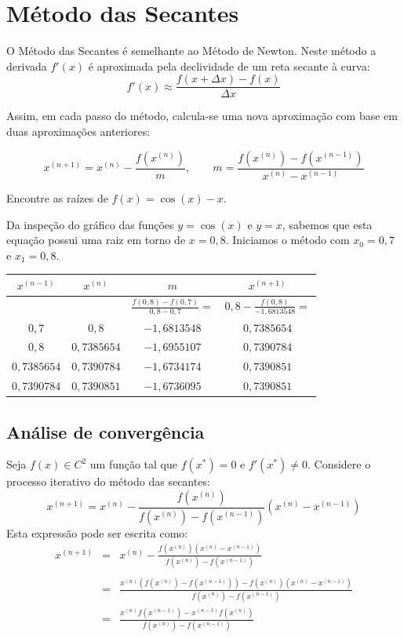 \documentclass[main.tex]{subfiles}
\begin{document}
\section{Método das Secantes}

O Método das Secantes é semelhante ao Método de Newton. Neste método a derivada $f'(x)$ é aproximada pela declividade de um reta secante à curva:
$$f'(x)\approx \frac{f(x+\Delta x)-f(x)}{\Delta x}$$

Assim, em cada passo do método, calcula-se uma nova aproximação com base em duas aproximações anteriores:

$$x^{(n+1)}=x^{(n)} - \frac{f(x^{(n)})}{m}, \qquad m= \frac{f(x^{(n)})-f(x^{(n-1)})}{x^{(n)}-x^{(n-1)}} $$


\begin{ex} Encontre as raízes de $f(x)=\cos(x)-x$.\end{ex}

Da inspeção do gráfico das funções $y=\cos(x)$ e $y=x$, sabemos que esta equação possui uma raiz em torno de $x=0,8$. Iniciamos o método com $x_0=0,7$ e $x_1=0,8$.

\begin{center}
\begin{tabular}{|c|c|c|c|}\hline
$x^{(n-1)}$ & $x^{(n)}$ & $m$ & $x^{(n+1)}$\\\hline
 & & $\frac{f(0,8)-f(0,7)}{0,8-0,7} =$ & $0,8- \frac{f(0,8)}{-1,6813548}=$\\
$0,7$ & $0,8$ & $-1,6813548$ & $0,7385654$\\\hline
$0,8$ & $0,7385654$ & $-1,6955107$ & $0,7390784$ \\\hline
 $0,7385654$ & $0,7390784$ &  $-1,6734174$ & $0,7390851$ \\\hline
$0,7390784$ & $0,7390851$ & $-1,6736095$ & $0,7390851$ \\\hline
\end{tabular}  
\end{center}

\subsection{Análise de convergência}

Seja $f(x)\in C^2$ um função tal que $f(x^*)=0$ e $f'(x^*)\neq 0$. Considere o processo iterativo do método das secantes:
$$x^{(n+1)}=x^{(n)}- \frac{f(x^{(n)})}{f(x^{(n)})-f(x^{(n-1)})}(x^{(n)}-x^{(n-1)})$$
Esta expressão pode ser escrita como:
\begin{eqnarray*}
x^{(n+1)}&=&x^{(n)}- \frac{f(x^{(n)})(x^{(n)}-x^{(n-1)})}{f(x^{(n)})-f(x^{(n-1)})}\\~\\
 &=&\frac{x^{(n)}\left(f(x^{(n)})-f(x^{(n-1)})\right)-f(x^{(n)})(x^{(n)}-x^{(n-1)})}{f(x^{(n)})-f(x^{(n-1)})}\\
 &=&\frac{x^{(n)} f(x^{(n-1)})-x^{(n-1)}f(x^{(n)})}{f(x^{(n)})-f(x^{(n-1)})}
\end{eqnarray*}
\end{document}
